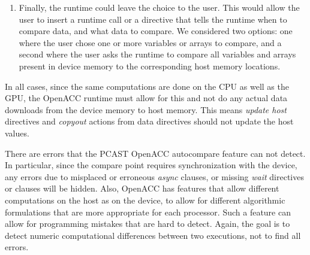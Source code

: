 \begin{enumerate}
\item Finally, the runtime could leave the choice to the user.
This would allow the user to insert a runtime call or a directive that tells the runtime when to compare data, and what data to compare.
We considered two options: one where the user chose one or more variables or arrays to compare, and a second where the user asks the runtime to compare all variables and arrays present in device memory to the corresponding host memory locations.
\end{enumerate}

In all cases, since the same computations are done on the CPU as well as the GPU, the OpenACC runtime must allow for this and not do any actual data downloads from the device memory to host memory.
This means \emph{update host} directives and \emph{copyout} actions from data directives should not update the host values.

There are errors that the PCAST OpenACC autocompare feature can not detect.
In particular, since the compare point requires synchronization with the device, any errors due to misplaced or erroneous \emph{async} clauses, or missing \emph{wait} directives or clauses will be hidden.
Also, OpenACC has features that allow different computations on the host as on the device, to allow for different algorithmic formulations that are more appropriate for each processor.
Such a feature can allow for programming mistakes that are hard to detect.
Again, the goal is to detect numeric computational differences between two executions, not to find all errors.
